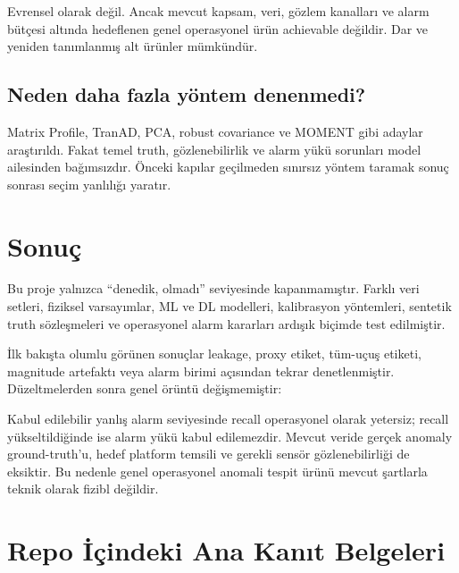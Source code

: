 \documentclass[11pt,a4paper,oneside]{report}
\begin{document}
Evrensel olarak değil. Ancak mevcut kapsam, veri, gözlem kanalları ve alarm
bütçesi altında hedeflenen genel operasyonel ürün achievable değildir. Dar
ve yeniden tanımlanmış alt ürünler mümkündür.

\section*{Neden daha fazla yöntem denenmedi?}

Matrix Profile, TranAD, PCA, robust covariance ve MOMENT gibi adaylar
araştırıldı. Fakat temel truth, gözlenebilirlik ve alarm yükü sorunları model
ailesinden bağımsızdır. Önceki kapılar geçilmeden sınırsız yöntem taramak
sonuç sonrası seçim yanlılığı yaratır.

\chapter{Sonuç}

Bu proje yalnızca ``denedik, olmadı'' seviyesinde kapanmamıştır. Farklı veri
setleri, fiziksel varsayımlar, ML ve DL modelleri, kalibrasyon yöntemleri,
sentetik truth sözleşmeleri ve operasyonel alarm kararları ardışık biçimde
test edilmiştir.

İlk bakışta olumlu görünen sonuçlar leakage, proxy etiket, tüm-uçuş etiketi,
magnitude artefaktı veya alarm birimi açısından tekrar denetlenmiştir.
Düzeltmelerden sonra genel örüntü değişmemiştir:

\begin{verdictbox}
Kabul edilebilir yanlış alarm seviyesinde recall operasyonel olarak yetersiz;
recall yükseltildiğinde ise alarm yükü kabul edilemezdir. Mevcut veride gerçek
anomaly ground-truth'u, hedef platform temsili ve gerekli sensör
gözlenebilirliği de eksiktir. Bu nedenle genel operasyonel anomali tespit
ürünü mevcut şartlarla teknik olarak fizibl değildir.
\end{verdictbox}

\appendix

\chapter{Repo İçindeki Ana Kanıt Belgeleri}
\end{document}
